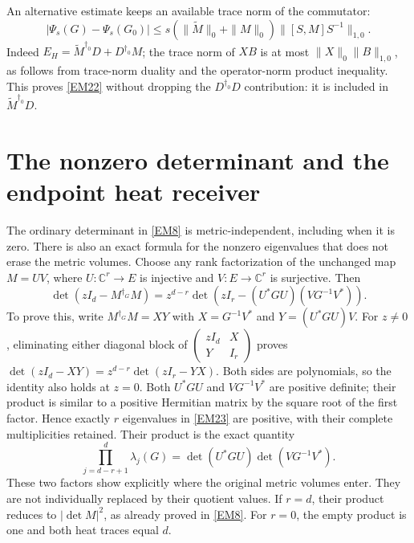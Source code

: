 \documentclass[11pt]{article}
\newcommand{\adjzero}{\dagger_0}
\newcommand{\adjg}{\dagger_G}
\begin{document}
An alternative estimate keeps an available trace norm of the
commutator:
\begin{equation}
 |\Psi_s(G)-\Psi_s(G_0)|
 \le s(\|\widetilde M\|_0+\|M\|_0)\|[S,M]S^{-1}\|_{1,0}.
 \tag{EM22}\label{EM22}
\end{equation}
Indeed \(E_H=\widetilde M^{\adjzero}D+D^{\adjzero}M\); the trace norm
of \(XB\) is at most \(\|X\|_0\|B\|_{1,0}\), as follows from trace-norm
duality and the operator-norm product inequality. This proves
\eqref{EM22} without dropping the \(D^{\adjzero}D\) contribution:
it is included in \(\widetilde M^{\adjzero}D\).

\section{The nonzero determinant and the endpoint heat receiver}

The ordinary determinant in \eqref{EM8} is metric-independent, including
when it is zero. There is also an exact formula for the nonzero
eigenvalues that does not erase the metric volumes. Choose any rank
factorization of the unchanged map
\(M=UV\), where \(U:\mathbb C^r\to E\) is injective and
\(V:E\to\mathbb C^r\) is surjective. Then
\begin{equation}
 \det(zI_d-M^{\adjg}M)
 =z^{d-r}\det\!\left(zI_r-(U^*GU)(VG^{-1}V^*)\right).
 \tag{EM23}\label{EM23}
\end{equation}
To prove this, write \(M^{\adjg}M=XY\) with
\(X=G^{-1}V^*\) and \(Y=(U^*GU)V\).
For \(z\ne0\), eliminating either diagonal block of
\(\left(\begin{smallmatrix}zI_d&X\\Y&I_r\end{smallmatrix}\right)\)
proves
\(\det(zI_d-XY)=z^{d-r}\det(zI_r-YX)\).
Both sides are polynomials, so the identity also holds at \(z=0\).
Both \(U^*GU\) and \(VG^{-1}V^*\) are positive definite; their product
is similar to a positive Hermitian matrix by the square root of the
first factor. Hence exactly \(r\) eigenvalues in \eqref{EM23} are
positive, with their complete multiplicities retained.
Their product is the exact quantity
\begin{equation}
 \prod_{j=d-r+1}^{d}\lambda_j(G)
     =\det(U^*GU)\det(VG^{-1}V^*).
 \tag{EM24}\label{EM24}
\end{equation}
These two factors show explicitly where the original metric volumes
enter. They are not individually replaced by their quotient values.
If \(r=d\), their product reduces to \(|\det M|^2\), as already
proved in \eqref{EM8}. For \(r=0\), the empty product is one and both
heat traces equal \(d\).
\end{document}
